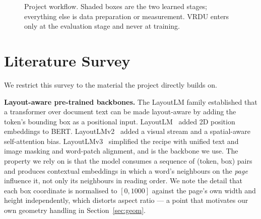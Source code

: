 \documentclass[11pt,a4paper]{article}
\begin{document}
\begin{figure}[htbp]
\centering
{}
\caption{Project workflow. Shaded boxes are the two learned stages; everything else is data
preparation or measurement. VRDU enters only at the evaluation stage and never at training.}
\label{fig:workflow}
\end{figure}

\section{Literature Survey}
\label{sec:lit}

We restrict this survey to the material the project directly builds on.

\textbf{Layout-aware pre-trained backbones.} The LayoutLM family established that a transformer
over document text can be made layout-aware by adding the token's bounding box as a positional
input. LayoutLM~\cite{layoutlm} added 2D position embeddings to BERT. LayoutLMv2~\cite{layoutlmv2}
added a visual stream and a spatial-aware self-attention bias. LayoutLMv3~\cite{layoutlmv3}
simplified the recipe with unified text and image masking and word-patch alignment, and is the
backbone we use. The property we rely on is that the model consumes a sequence of
(token, box) pairs and produces contextual embeddings in which a word's neighbours on the
\emph{page} influence it, not only its neighbours in reading order. We note the detail that each
box coordinate is normalised to $[0, 1000]$ against the page's own width and height
independently, which distorts aspect ratio --- a point that motivates our own geometry handling
in Section~\ref{sec:geom}.
\end{document}

